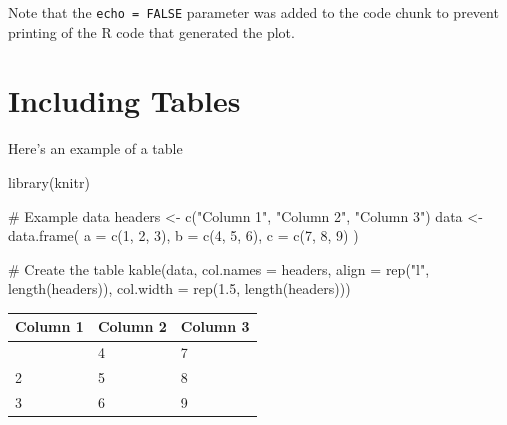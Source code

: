 \documentclass[
  letterpaper,
]{report}
\newenvironment{Shaded}{\begin{snugshade}}{\end{snugshade}}
\newcommand{\AttributeTok}[1]{\textcolor[rgb]{0.40,0.45,0.13}{#1}}
\newcommand{\CommentTok}[1]{\textcolor[rgb]{0.37,0.37,0.37}{#1}}
\newcommand{\DecValTok}[1]{\textcolor[rgb]{0.68,0.00,0.00}{#1}}
\newcommand{\FloatTok}[1]{\textcolor[rgb]{0.68,0.00,0.00}{#1}}
\newcommand{\FunctionTok}[1]{\textcolor[rgb]{0.28,0.35,0.67}{#1}}
\newcommand{\NormalTok}[1]{\textcolor[rgb]{0.00,0.23,0.31}{#1}}
\newcommand{\OtherTok}[1]{\textcolor[rgb]{0.00,0.23,0.31}{#1}}
\newcommand{\StringTok}[1]{\textcolor[rgb]{0.13,0.47,0.30}{#1}}
\begin{document}
Note that the \texttt{echo\ =\ FALSE} parameter was added to the code
chunk to prevent printing of the R code that generated the plot.

\hypertarget{including-tables}{%
\section{Including Tables}\label{including-tables}}

Here's an example of a table

\begin{Shaded}
\begin{Highlighting}[]
\FunctionTok{library}\NormalTok{(knitr)}

\CommentTok{\# Example data}
\NormalTok{headers }\OtherTok{\textless{}{-}} \FunctionTok{c}\NormalTok{(}\StringTok{"Column 1"}\NormalTok{, }\StringTok{"Column 2"}\NormalTok{, }\StringTok{"Column 3"}\NormalTok{)}
\NormalTok{data }\OtherTok{\textless{}{-}} \FunctionTok{data.frame}\NormalTok{(}
  \AttributeTok{a =} \FunctionTok{c}\NormalTok{(}\DecValTok{1}\NormalTok{, }\DecValTok{2}\NormalTok{, }\DecValTok{3}\NormalTok{),}
  \AttributeTok{b =} \FunctionTok{c}\NormalTok{(}\DecValTok{4}\NormalTok{, }\DecValTok{5}\NormalTok{, }\DecValTok{6}\NormalTok{),}
  \AttributeTok{c =} \FunctionTok{c}\NormalTok{(}\DecValTok{7}\NormalTok{, }\DecValTok{8}\NormalTok{, }\DecValTok{9}\NormalTok{)}
\NormalTok{)}

\CommentTok{\# Create the table}
\FunctionTok{kable}\NormalTok{(data, }\AttributeTok{col.names =}\NormalTok{ headers, }\AttributeTok{align =} \FunctionTok{rep}\NormalTok{(}\StringTok{"l"}\NormalTok{, }\FunctionTok{length}\NormalTok{(headers)), }
      \AttributeTok{col.width =} \FunctionTok{rep}\NormalTok{(}\FloatTok{1.5}\NormalTok{, }\FunctionTok{length}\NormalTok{(headers)))}
\end{Highlighting}
\end{Shaded}

\begin{longtable}[]{@{}lll@{}}
\toprule\noalign{}
Column 1 & Column 2 & Column 3 \\
\midrule\noalign{}
\endhead
\bottomrule\noalign{}
\endlastfoot
1 & 4 & 7 \\
2 & 5 & 8 \\
3 & 6 & 9 \\
\end{longtable}
\end{document}

